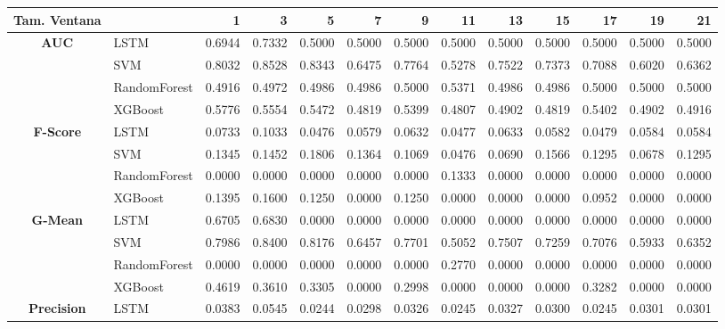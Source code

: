 \begin{table}[h]
	\centering
	\begin{adjustbox}{max width=15cm}
		\begin{tabular}{|c|l|r|r|r|r|r|r|r|r|r|r|r|}
			\hline
			\textbf{Tam. Ventana} &         &      1  &      3  &      5  &      7  &      9  &      11 &      13 &      15 &      17 &      19 &      21 \\
			\hline
			\textbf{AUC} & LSTM &  0.6944 &  0.7332 &  0.5000 &  0.5000 &  0.5000 &  0.5000 &  0.5000 &  0.5000 &  0.5000 &  0.5000 &  0.5000 \\
			& SVM &  0.8032 &  0.8528 &  0.8343 &  0.6475 &  0.7764 &  0.5278 &  0.7522 &  0.7373 &  0.7088 &  0.6020 &  0.6362 \\
			& RandomForest &  0.4916 &  0.4972 &  0.4986 &  0.4986 &  0.5000 &  0.5371 &  0.4986 &  0.4986 &  0.5000 &  0.5000 &  0.5000 \\
			& XGBoost &  0.5776 &  0.5554 &  0.5472 &  0.4819 &  0.5399 &  0.4807 &  0.4902 &  0.4819 &  0.5402 &  0.4902 &  0.4916 \\
			\hline
			\textbf{F-Score} & LSTM &  0.0733 &  0.1033 &  0.0476 &  0.0579 &  0.0632 &  0.0477 &  0.0633 &  0.0582 &  0.0479 &  0.0584 &  0.0584 \\
			& SVM &  0.1345 &  0.1452 &  0.1806 &  0.1364 &  0.1069 &  0.0476 &  0.0690 &  0.1566 &  0.1295 &  0.0678 &  0.1295 \\
			& RandomForest &  0.0000 &  0.0000 &  0.0000 &  0.0000 &  0.0000 &  0.1333 &  0.0000 &  0.0000 &  0.0000 &  0.0000 &  0.0000 \\
			& XGBoost &  0.1395 &  0.1600 &  0.1250 &  0.0000 &  0.1250 &  0.0000 &  0.0000 &  0.0000 &  0.0952 &  0.0000 &  0.0000 \\
			\hline
			\textbf{G-Mean} & LSTM &  0.6705 &  0.6830 &  0.0000 &  0.0000 &  0.0000 &  0.0000 &  0.0000 &  0.0000 &  0.0000 &  0.0000 &  0.0000 \\
			& SVM &  0.7986 &  0.8400 &  0.8176 &  0.6457 &  0.7701 &  0.5052 &  0.7507 &  0.7259 &  0.7076 &  0.5933 &  0.6352 \\
			& RandomForest &  0.0000 &  0.0000 &  0.0000 &  0.0000 &  0.0000 &  0.2770 &  0.0000 &  0.0000 &  0.0000 &  0.0000 &  0.0000 \\
			& XGBoost &  0.4619 &  0.3610 &  0.3305 &  0.0000 &  0.2998 &  0.0000 &  0.0000 &  0.0000 &  0.3282 &  0.0000 &  0.0000 \\
			\hline
			\textbf{Precision} & LSTM &  0.0383 &  0.0545 &  0.0244 &  0.0298 &  0.0326 &  0.0245 &  0.0327 &  0.0300 &  0.0245 &  0.0301 &  0.0301 \\

\end{tabular}
\end{adjustbox}
\end{table}
